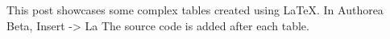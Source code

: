 This post showcases some complex tables created using LaTeX. In Authorea Beta, Insert -> La The source code is added after each table.

\newline